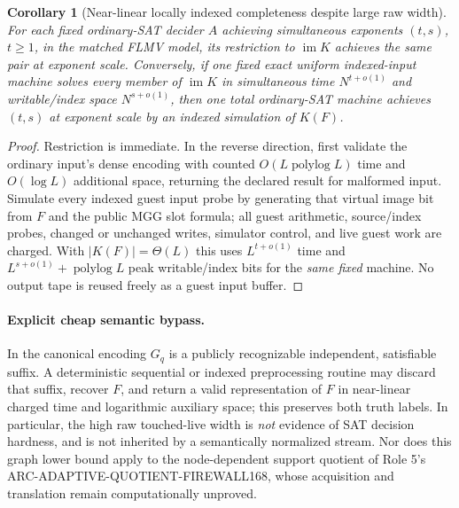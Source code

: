 \documentclass[11pt]{article}
\newtheorem{corollary}[theorem]{Corollary}
\begin{document}
\begin{corollary}[Near-linear locally indexed completeness despite large raw width]
For each fixed ordinary-SAT decider $A$ achieving simultaneous exponents $(t,s)$, $t\ge1$, in the matched FLMV model, its restriction to $\operatorname{im}K$ achieves the same pair at exponent scale. Conversely, if \emph{one fixed} exact uniform indexed-input machine solves every member of $\operatorname{im}K$ in simultaneous time $N^{t+o(1)}$ and writable/index space $N^{s+o(1)}$, then one total ordinary-SAT machine achieves $(t,s)$ at exponent scale by an indexed simulation of $K(F)$.
\end{corollary}
\begin{proof}
Restriction is immediate. In the reverse direction, first validate the ordinary input's dense encoding with counted $O(L\operatorname{polylog}L)$ time and $O(\log L)$ additional space, returning the declared result for malformed input. Simulate every indexed guest input probe by generating that virtual image bit from $F$ and the public MGG slot formula; all guest arithmetic, source/index probes, changed or unchanged writes, simulator control, and live guest work are charged. With $|K(F)|=\Theta(L)$ this uses $L^{t+o(1)}$ time and $L^{s+o(1)}+\operatorname{polylog}L$ peak writable/index bits for the \emph{same fixed} machine. No output tape is reused freely as a guest input buffer.
\end{proof}

\paragraph{Explicit cheap semantic bypass.}
In the canonical encoding $G_q$ is a publicly recognizable independent, satisfiable suffix. A deterministic sequential or indexed preprocessing routine may discard that suffix, recover $F$, and return a valid representation of $F$ in near-linear charged time and logarithmic auxiliary space; this preserves both truth labels. In particular, the high raw touched-live width is \emph{not} evidence of SAT decision hardness, and is not inherited by a semantically normalized stream. Nor does this graph lower bound apply to the node-dependent support quotient of Role 5's ARC-ADAPTIVE-QUOTIENT-FIREWALL168, whose acquisition and translation remain computationally unproved.
\end{document}
